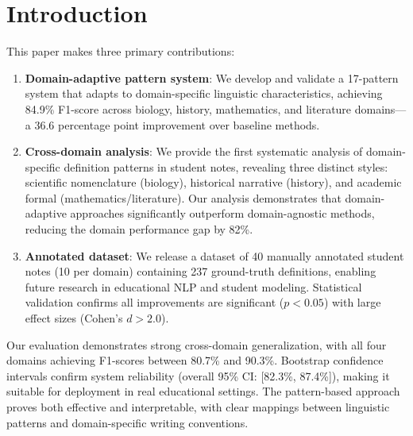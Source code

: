\section{Introduction}



This paper makes three primary contributions:

\begin{enumerate}
\item \textbf{Domain-adaptive pattern system}: We develop and validate a 17-pattern system that adapts to domain-specific linguistic characteristics, achieving 84.9\% F1-score across biology, history, mathematics, and literature domains—a 36.6 percentage point improvement over baseline methods.

\item \textbf{Cross-domain analysis}: We provide the first systematic analysis of domain-specific definition patterns in student notes, revealing three distinct styles: scientific nomenclature (biology), historical narrative (history), and academic formal (mathematics/literature). Our analysis demonstrates that domain-adaptive approaches significantly outperform domain-agnostic methods, reducing the domain performance gap by 82\%.

\item \textbf{Annotated dataset}: We release a dataset of 40 manually annotated student notes (10 per domain) containing 237 ground-truth definitions, enabling future research in educational NLP and student modeling. Statistical validation confirms all improvements are significant ($p < 0.05$) with large effect sizes (Cohen's $d > 2.0$).
\end{enumerate}


Our evaluation demonstrates strong cross-domain generalization, with all four domains achieving F1-scores between 80.7\% and 90.3\%. Bootstrap confidence intervals confirm system reliability (overall 95\% CI: [82.3\%, 87.4\%]), making it suitable for deployment in real educational settings. The pattern-based approach proves both effective and interpretable, with clear mappings between linguistic patterns and domain-specific writing conventions.
